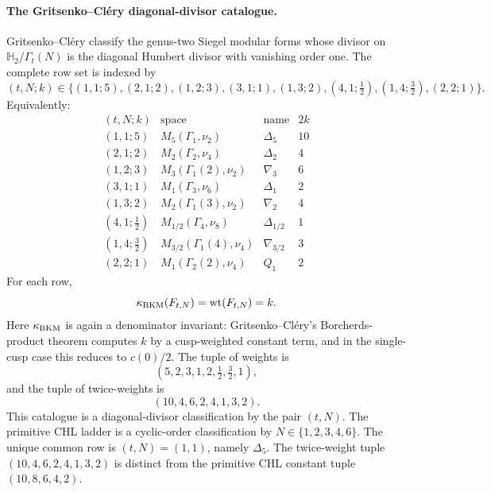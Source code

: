\paragraph{The Gritsenko--Cl\'ery diagonal-divisor catalogue.}
Gritsenko--Cl\'ery classify the genus-two Siegel modular forms whose
divisor on \(\mathbb H_2/\Gamma_t(N)\) is the diagonal Humbert divisor
with vanishing order one.  The complete row set is indexed by
\[
 (t,N;k)\in
 \bigl\{(1,1;5),(2,1;2),(1,2;3),(3,1;1),(1,3;2),
 (4,1;\tfrac12),(1,4;\tfrac32),(2,2;1)\bigr\}.
\]
Equivalently:
\[
\begin{array}{c|c|c|c}
(t,N;k) & \text{space} & \text{name} & 2k \\ \hline
(1,1;5) & M_5(\Gamma_1,\nu_2) & \Delta_5 & 10 \\
(2,1;2) & M_2(\Gamma_2,\nu_4) & \Delta_2 & 4 \\
(1,2;3) & M_3(\Gamma_1(2),\nu_2) & \nabla_3 & 6 \\
(3,1;1) & M_1(\Gamma_3,\nu_6) & \Delta_1 & 2 \\
(1,3;2) & M_2(\Gamma_1(3),\nu_2) & \nabla_2 & 4 \\
(4,1;\tfrac12) & M_{1/2}(\Gamma_4,\nu_8) & \Delta_{1/2} & 1 \\
(1,4;\tfrac32) & M_{3/2}(\Gamma_1(4),\nu_4) & \nabla_{3/2} & 3 \\
(2,2;1) & M_1(\Gamma_2(2),\nu_4) & Q_1 & 2
\end{array}
\]
For each row,
\[
  \kappa_{\mathrm{BKM}}(F_{t,N})=\mathrm{wt}(F_{t,N})=k.
\]
Here \(\kappa_{\mathrm{BKM}}\) is again a denominator invariant: Gritsenko--Cl\'ery's
Borcherds-product theorem computes \(k\) by a cusp-weighted constant
term, and in the single-cusp case this reduces to \(c(0)/2\).
The tuple of weights is
\[
  (5,2,3,1,2,\tfrac12,\tfrac32,1),
\]
and the tuple of twice-weights is
\[
  (10,4,6,2,4,1,3,2).
\]
This catalogue is a diagonal-divisor classification by the pair
\((t,N)\).  The primitive CHL ladder is a cyclic-order classification
by \(N\in\{1,2,3,4,6\}\).  The unique common row is
\((t,N)=(1,1)\), namely \(\Delta_5\).  The twice-weight tuple
\((10,4,6,2,4,1,3,2)\) is distinct from the primitive CHL constant tuple
\((10,8,6,4,2)\).

